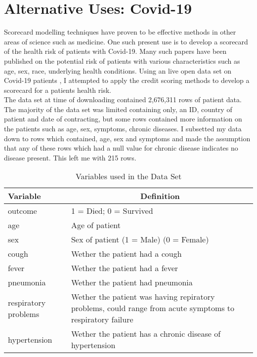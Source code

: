 \chapter{Alternative Uses: Covid-19} \label{cha:chapter-5}

Scorecard modelling techniques have proven to be effective methods in other areas of science such as medicine. One such present use is to develop a scorecard of the health risk of patients with Covid-19. Many such papers have been published on the potential risk of patients with various characteristics such as age, sex, race, underlying health conditions. Using an live open data set on Covid-19 patients \parencite{kraemer2020epidemiological}, I attempted to apply the credit scoring methods to develop a scorecard for a patients health risk. \\ 

The data set at time of downloading contained 2,676,311 rows of patient data. The majority of the data set was limited containing only, an ID, country of patient and date of contracting, but some rows contained more information on the patients such as age, sex, symptoms, chronic diseases. I subsetted my data down to rows which contained, age, sex and symptoms and made the assumption that any of these rows which had a null value for chronic disease indicates no disease present. This left me with 215 rows. \\

\begin{table}[H]
	\centering
	\renewcommand{\arraystretch}{1.25}
	\begin{tabular}{l p{10cm}}
	\hline
	Variable & \multicolumn{1}{c}{Definition}\\ 
	\hline
	outcome & 1 = Died; 0 = Survived \\
	age & Age of patient \\
	sex & Sex of patient (1 = Male) (0 = Female) \\
	cough & Wether the patient had a cough \\
	fever & Wether the patient had a fever \\
	pneumonia & Wether the patient had pneumonia \\
	respiratory problems & Wether the patient was having repiratory problems, could range from acute symptoms to respiratory failure \\
	hypertension & Wether the patient has a chronic disease of hypertension \\
	\end{tabular}
	\caption{Variables used in the Data Set \label{CovidData}}
\end{table}

